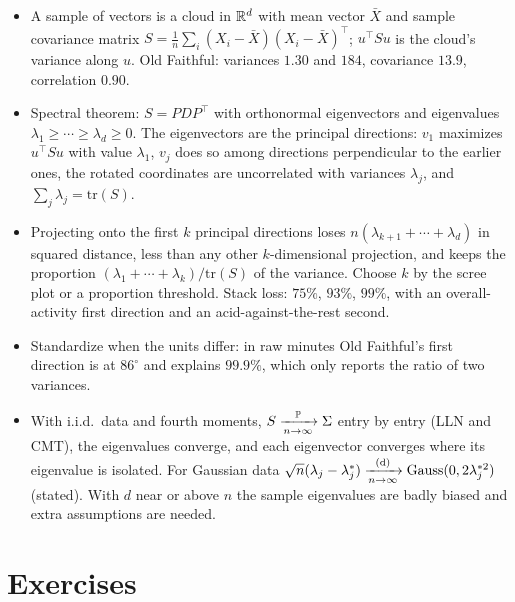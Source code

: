 \begin{itemize}[nosep]
\item A sample of vectors is a cloud in $\mathbb{R}^d$ with mean vector $\bar{X}$ and sample covariance matrix $S = \frac1n\sum_i(X_i - \bar{X})(X_i - \bar{X})^\top$; $u^\top Su$ is the cloud's variance along $u$. Old Faithful: variances $1.30$ and $184$, covariance $13.9$, correlation $0.90$.
\item Spectral theorem: $S = PDP^\top$ with orthonormal eigenvectors and eigenvalues $\lambda_1 \geq \cdots \geq \lambda_d \geq 0$. The eigenvectors are the principal directions: $v_1$ maximizes $u^\top Su$ with value $\lambda_1$, $v_j$ does so among directions perpendicular to the earlier ones, the rotated coordinates are uncorrelated with variances $\lambda_j$, and $\sum_j\lambda_j = \mathrm{tr}(S)$.
\item Projecting onto the first $k$ principal directions loses $n(\lambda_{k+1} + \cdots + \lambda_d)$ in squared distance, less than any other $k$-dimensional projection, and keeps the proportion $(\lambda_1 + \cdots + \lambda_k)/\mathrm{tr}(S)$ of the variance. Choose $k$ by the scree plot or a proportion threshold. Stack loss: $75\%$, $93\%$, $99\%$, with an overall-activity first direction and an acid-against-the-rest second.
\item Standardize when the units differ: in raw minutes Old Faithful's first direction is at $86^\circ$ and explains $99.9\%$, which only reports the ratio of two variances.
\item With i.i.d.\ data and fourth moments, $S \xrightarrow [n \to \infty ]{\mathbb{P}} \Sigma$ entry by entry (LLN and CMT), the eigenvalues converge, and each eigenvector converges where its eigenvalue is isolated. For Gaussian data $\sqrt{n}(\lambda_j - \lambda_j^*) \xrightarrow [n \to \infty ]{\text{(d)}} \text{Gauss}(0, 2\lambda_j^{*2})$ (stated). With $d$ near or above $n$ the sample eigenvalues are badly biased and extra assumptions are needed.
\end{itemize}

\section{Exercises}
\label{sec:pca-exercises}

